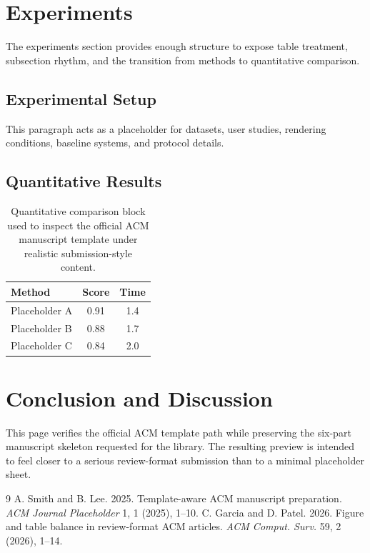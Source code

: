 \documentclass[manuscript]{acmart}
\begin{document}
\section{Experiments}
The experiments section provides enough structure to expose table treatment, subsection rhythm, and the transition from methods to quantitative comparison.
\subsection{Experimental Setup}
This paragraph acts as a placeholder for datasets, user studies, rendering conditions, baseline systems, and protocol details.
\subsection{Quantitative Results}
\begin{table}[t]
\caption{Quantitative comparison block used to inspect the official ACM manuscript template under realistic submission-style content.}
\centering
\begin{tabular}{lcc}
\toprule
Method & Score & Time \\
\midrule
Placeholder A & 0.91 & 1.4 \\
Placeholder B & 0.88 & 1.7 \\
Placeholder C & 0.84 & 2.0 \\
\bottomrule
\end{tabular}
\end{table}
\section{Conclusion and Discussion}
This page verifies the official ACM template path while preserving the six-part manuscript skeleton requested for the library. The resulting preview is intended to feel closer to a serious review-format submission than to a minimal placeholder sheet.
\begin{thebibliography}{9}
 A. Smith and B. Lee. 2025. Template-aware ACM manuscript preparation. \emph{ACM Journal Placeholder} 1, 1 (2025), 1--10.
 C. Garcia and D. Patel. 2026. Figure and table balance in review-format ACM articles. \emph{ACM Comput. Surv.} 59, 2 (2026), 1--14.
\end{thebibliography}
\end{document}
